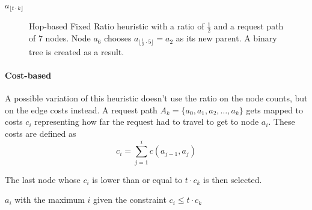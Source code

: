 \documentclass[a4paper, oneside]{discothesis}
\begin{document}
\begin{algorithmic}
\State\Return $a_{\lfloor t\cdot k\rfloor}$
\EndFunction
\end{algorithmic}

\begin{figure}[H]
\centering
{}
\caption{Hop-based Fixed Ratio heuristic with a ratio of $\frac{1}{2}$ and a request path of 7 nodes. Node $a_{6}$ chooses $a_{\lfloor \frac{1}{2}\cdot 5 \rfloor}=a_{2}$ as its new parent. A binary tree is created as a result.}
\label{fig:fpr}
\end{figure}

\paragraph{Cost-based}\label{alg:frc}

A possible variation of this heuristic doesn't use the ratio on the node counts, but on the edge costs instead. A request path $A_k=\{a_{0},a_{1},a_{2},\dots,a_{k}\}$ gets mapped to costs $c_i$ representing how far the request had to travel to get to node $a_i$. These costs are defined as
\begin{equation}
c_i=\sum_{j=1}^ic(a_{j-1},a_{j})
\end{equation}

The last node whose $c_i$ is lower than or equal to $t\cdot c_k$ is then selected.

\begin{algorithmic}
\State\Return $a_{i}$ with the maximum $i$ given the constraint $c_i\leq t\cdot c_k$ 
\EndFunction
\end{algorithmic}
\end{document}
